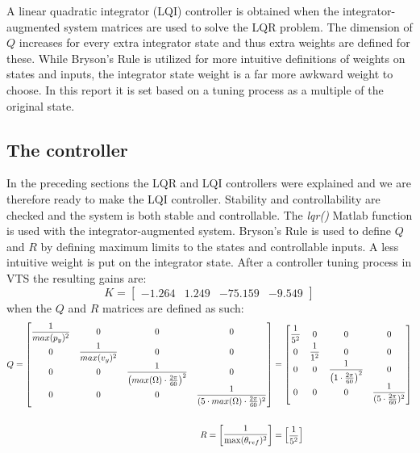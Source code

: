 A linear quadratic integrator (LQI) controller is obtained when the integrator-augmented system matrices are used to solve the LQR problem. The dimension of $ Q $ increases for every extra integrator state and thus extra weights are defined for these. While Bryson's Rule is utilized for more intuitive definitions of weights on states and inputs, the integrator state weight is a far more awkward weight to choose. In this report it is set based on a tuning process as a multiple of the original state.


\subsection{The controller} \label{sec:ctrl_thecontroller}
In the preceding sections the LQR and LQI controllers were explained and we are therefore ready to make the LQI controller. Stability and controllability are checked and the system is both stable and controllable. The \textit{lqr()} Matlab function is used with the integrator-augmented system. Bryson's Rule is used to define $ Q $ and $ R $ by defining maximum limits to the states and controllable inputs. A less intuitive weight is put on the integrator state. After a controller tuning process in VTS the resulting gains are:
\begin{equation}\label{eq:lqi_K}
	K = \begin{bmatrix} -1.264 &  1.249 & -75.159 & -9.549 \end{bmatrix}
\end{equation}
when the $ Q $ and $ R $ matrices are defined as such:
\begin{equation}\label{eq:lqi_Q_and_R}
	\begin{split}
		Q = \begin{bmatrix}
			\dfrac{1}{max(p_y)^2}& 0 					& 0 															& 0 \cr
			0 					& \dfrac{1}{max(v_y)^2}	& 0 															& 0 \cr
			0 					& 0 					& \dfrac{1}{\left( max(\Omega) \cdot \frac{2 \pi}{60} \right)^2} & 0 \cr
			0 					& 0 					& 0 															& \dfrac{1}{(5 \cdot max(\Omega) \cdot \frac{2 \pi}{60})^2} \end{bmatrix} & = \begin{bmatrix}
			\dfrac{1}{5^2} 	&  	0 				&  0 										&  0 \cr
			0 				&  \dfrac{1}{1^2}	&  0 										&  0 \cr
			0 				&  0 				& \dfrac{1}{\left( 1 \cdot \frac{2 \pi}{60} \right)^2} 	&  0 \cr
			0 				&  0 				&  0 										&  \dfrac{1}{(5 \cdot \frac{2 \pi}{60})^2}
		\end{bmatrix} \\\\
		R = \begin{bmatrix} \dfrac{1}{\max(\theta_{ref})^2} \end{bmatrix} &= \begin{bmatrix} \dfrac{1}{5^2} \end{bmatrix}
	\end{split}
\end{equation}
